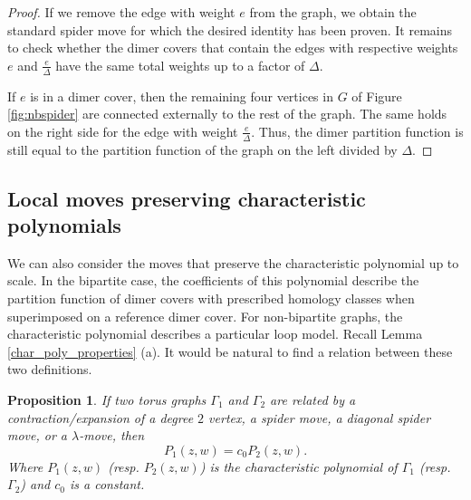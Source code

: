 \documentclass[12pt,a4paper]{article}
\newtheorem{prop}[thm]{Proposition}
\theoremstyle{definition}
\begin{document}
\begin{proof}
    If we remove the edge with weight $e$ from the graph, we obtain the standard spider move for which the desired identity has been proven. It remains to check whether the dimer covers that contain the edges with respective weights $e$ and $\tfrac e \Delta$ have the same total weights up to a factor of $\Delta$.
    
    If $e$ is in a dimer cover, then the remaining four vertices in $G$ of Figure \ref{fig:nbspider} are connected externally to the rest of the graph. The same holds on the right side for the edge with weight $\frac{e}{\Delta}$. Thus, the dimer partition function is still equal to the partition function of the graph on the left divided by $\Delta$.
\end{proof}

\subsection{Local moves preserving characteristic polynomials}

We can also consider the moves that preserve the characteristic polynomial up to scale. In the bipartite case, the coefficients of this polynomial describe the partition function of dimer covers with prescribed homology classes when superimposed on a reference dimer cover. For non-bipartite graphs, the characteristic polynomial describes a particular loop model. Recall Lemma \ref{char_poly_properties} (a). It would be natural to find a relation between these two definitions. 

\begin{prop}
    If two torus graphs $\Gamma_1$ and $\Gamma_2$ are related by a  contraction/expansion of a degree $2$ vertex, a spider move, a diagonal spider move, or a $\lambda$-move, then 
    \[P_1(z,w) = c_0 P_2(z,w).\]
    Where $P_1(z,w)$ (resp. $P_2(z,w)$) is the characteristic polynomial of $\Gamma_1$ (resp. $\Gamma_2$) and $c_0$ is a constant. 
\end{prop}
\end{document}
